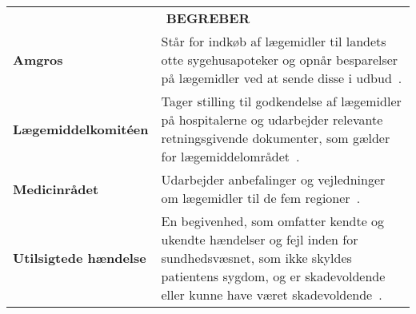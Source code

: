 \begin{table}[H]
\label{table:begreber}
\begin{tabular}{p{4.5cm} p{9.8cm}}
\multicolumn{2}{c}{\cellcolor[HTML]{C0C0C0}\textbf{BEGREBER}} \vspace{0.2cm}\\
\textbf{Amgros} & Står for indkøb af lægemidler til landets otte sygehusapoteker og opnår besparelser på lægemidler ved at sende disse i udbud~\citep{Amgros2018b}. \vspace{0.2cm} \\
\textbf{Lægemiddelkomitéen} & Tager stilling til godkendelse af lægemidler på hospitalerne og udarbejder relevante retningsgivende dokumenter, som gælder for lægemiddelområdet~\citep{RegionNordjylland2018}. \vspace{0.2cm} \\
\textbf{Medicinrådet} & Udarbejder anbefalinger og vejledninger om lægemidler til de fem regioner~\citep{Medicinradet2018}.\vspace{0.2cm} \\
\textbf{Utilsigtede hændelse} & En begivenhed, som omfatter kendte og ukendte hændelser og fejl inden for sundhedsvæsnet, som ikke skyldes patientens sygdom, og er skadevoldende eller kunne have været skadevoldende~\citep{RegionMidtjylland2016}.
\vspace{0.5cm} \\

\end{tabular}
\end{table}
